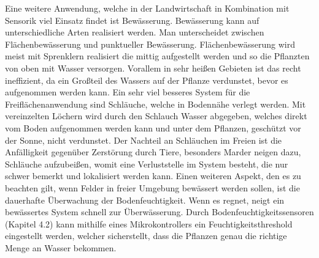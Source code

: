 Eine weitere Anwendung, welche in der Landwirtschaft in Kombination mit
Sensorik viel Einsatz findet ist Bewässerung. Bewässerung kann auf
unterschiedliche Arten realisiert werden. Man unterscheidet zwischen
Flächenbewässerung und punktueller Bewässerung. Flächenbewässerung wird meist
mit Sprenklern realisiert die mittig aufgestellt werden und so die Pflanzten
von oben mit Wasser versorgen. Vorallem in sehr heißen Gebieten ist das recht
ineffizient, da ein Großteil des Wassers auf der Pflanze verdunstet, bevor es
aufgenommen werden kann. Ein sehr viel besseres System für die
Freiflächenanwendung sind Schläuche, welche in Bodennähe verlegt werden. Mit
vereinzelten Löchern wird durch den Schlauch Wasser abgegeben, welches direkt
vom Boden aufgenommen werden kann und unter dem Pflanzen, geschützt vor der
Sonne, nicht verdunstet. Der Nachteil an Schläuchen im Freien ist die
Anfälligkeit gegenüber Zerstörung durch Tiere, besonders Marder neigen dazu,
Schläuche aufzubeißen, womit eine Verluststelle im System besteht, die nur
schwer bemerkt und lokalisiert werden kann. Einen weiteren Aspekt, den es zu
beachten gilt, wenn Felder in freier Umgebung bewässert werden sollen, ist die
dauerhafte Überwachung der Bodenfeuchtigkeit. Wenn es regnet, neigt ein
bewässertes System schnell zur Überwässerung. Durch Bodenfeuchtigkeitssensoren
(Kapitel 4.2) kann mithilfe eines Mikrokontrollers ein Feuchtigkeitsthreshold
eingestellt werden, welcher sicherstellt, dass die Pflanzen genau die richtige
Menge an Wasser bekommen.